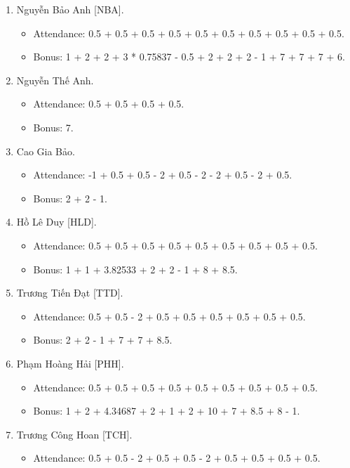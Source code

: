 \documentclass{article}
\begin{document}
\begin{enumerate}
    \item {\sc Nguyễn Bảo Anh [NBA].}
    \begin{itemize}
        \item Attendance: 0.5 + 0.5 + 0.5 + 0.5 + 0.5 + 0.5 + 0.5 + 0.5 + 0.5 + 0.5.
        \item Bonus: 1 + 2 + 2 + 3 * 0.75837 - 0.5 + 2 + 2 + 2 - 1 + 7 + 7 + 7 + 6.
    \end{itemize}
    \item {\sc Nguyễn Thế Anh.}
    \begin{itemize}
    	\item Attendance: 0.5 + 0.5 + 0.5 + 0.5.
    	\item Bonus: 7.
    \end{itemize}
    \item {\sc Cao Gia Bảo.}
    \begin{itemize}
        \item Attendance: -1 + 0.5 + 0.5 - 2 + 0.5 - 2 - 2 + 0.5 - 2 + 0.5.
        \item Bonus: 2 + 2 - 1.
    \end{itemize}
    \item {\sc Hồ Lê Duy [HLD].}
    \begin{itemize}
        \item Attendance: 0.5 + 0.5 + 0.5 + 0.5 + 0.5 + 0.5 + 0.5 + 0.5 + 0.5.
        \item Bonus: 1 + 1 + 3.82533 + 2 + 2 - 1 + 8 + 8.5.
    \end{itemize}
    \item {\sc Trương Tiến Đạt [TTD].}
    \begin{itemize}
        \item Attendance: 0.5 + 0.5 - 2 + 0.5 + 0.5 + 0.5 + 0.5 + 0.5 + 0.5.
        \item Bonus: 2 + 2 - 1 + 7 + 7 + 8.5.
    \end{itemize}
    \item {\sc Phạm Hoàng Hải [PHH].}
    \begin{itemize}
        \item Attendance: 0.5 + 0.5 + 0.5 + 0.5 + 0.5 + 0.5 + 0.5 + 0.5 + 0.5.
        \item Bonus: 1 + 2 + 4.34687 + 2 + 1 + 2 + 10 + 7 + 8.5 + 8 - 1.
    \end{itemize}
    \item {\sc Trương Công Hoan [TCH].}
    \begin{itemize}
        \item Attendance: 0.5 + 0.5 - 2 + 0.5 + 0.5 - 2 + 0.5 + 0.5 + 0.5 + 0.5.

\end{itemize}
\end{enumerate}
\end{document}
